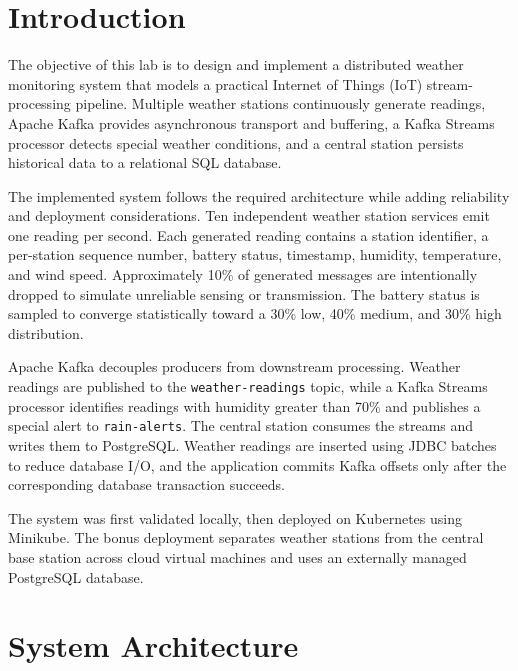 \documentclass[12pt,a4paper]{article}
\begin{document}
\tableofcontents
\newpage
\listoffigures
\newpage

\section{Introduction}
The objective of this lab is to design and implement a distributed weather monitoring system that models a practical Internet of Things (IoT) stream-processing pipeline. Multiple weather stations continuously generate readings, Apache Kafka provides asynchronous transport and buffering, a Kafka Streams processor detects special weather conditions, and a central station persists historical data to a relational SQL database.

The implemented system follows the required architecture while adding reliability and deployment considerations. Ten independent weather station services emit one reading per second. Each generated reading contains a station identifier, a per-station sequence number, battery status, timestamp, humidity, temperature, and wind speed. Approximately 10\% of generated messages are intentionally dropped to simulate unreliable sensing or transmission. The battery status is sampled to converge statistically toward a 30\% low, 40\% medium, and 30\% high distribution.

Apache Kafka decouples producers from downstream processing. Weather readings are published to the \texttt{weather-readings} topic, while a Kafka Streams processor identifies readings with humidity greater than 70\% and publishes a special alert to \texttt{rain-alerts}. The central station consumes the streams and writes them to PostgreSQL. Weather readings are inserted using JDBC batches to reduce database I/O, and the application commits Kafka offsets only after the corresponding database transaction succeeds.

The system was first validated locally, then deployed on Kubernetes using Minikube. The bonus deployment separates weather stations from the central base station across cloud virtual machines and uses an externally managed PostgreSQL database.

\section{System Architecture}
\end{document}
